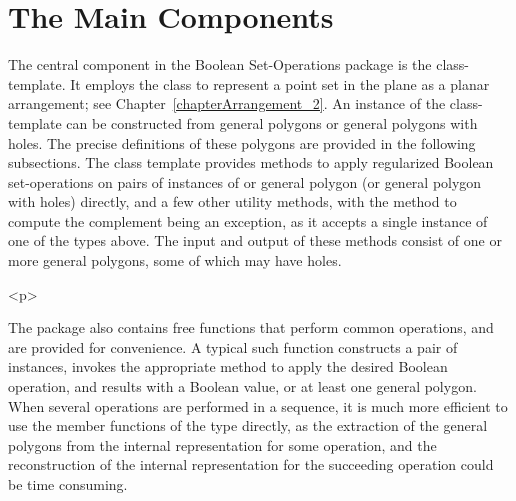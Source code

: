 \section{The Main Components}
\label{bobs_sec:main_components}
The central component in the Boolean Set-Operations package is the
 class-template. It employs the
 class to represent a point set in the plane as a
planar arrangement; see Chapter~\ref{chapterArrangement_2}. 
An instance of the  class-template can be
constructed from general polygons or general polygons with holes. The
precise definitions of these polygons are provided in the following
subsections. The class template provides methods to apply regularized 
Boolean set-operations on pairs of instances of  
or general polygon (or general polygon with holes) directly, and a few
other utility methods, with the method to compute the complement being 
an exception, as it accepts a single instance of one of the types above. 
The input and output of these methods consist of one or more general 
polygons, some of which may have holes.

\begin{ccHtmlOnly}<p>\end{ccHtmlOnly}
The package also contains free functions that perform common operations,
and are provided for convenience. A typical such function constructs a pair
of  instances, invokes the appropriate method to
apply the desired Boolean operation, and results with a Boolean value, or at
least one general polygon. When several operations are performed in a 
sequence, it is much more efficient to use the member functions of the
 type directly, as the extraction of the general
polygons from the internal representation for some operation, and the
reconstruction of the internal representation for the succeeding operation
could be time consuming.

